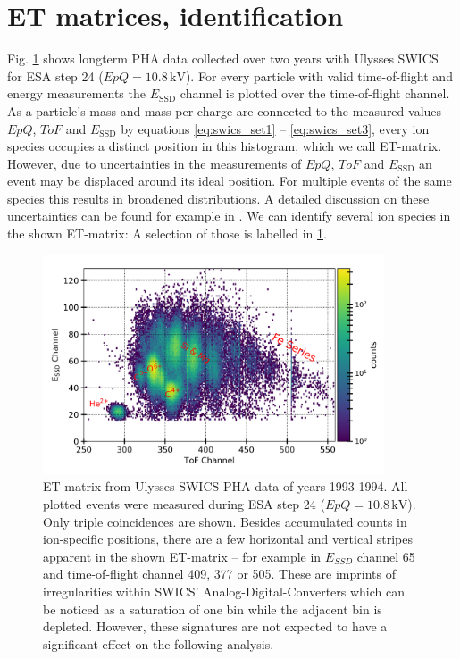 \section{ET matrices, identification}
\label{sec:etmatrices}
Fig. \ref{fig:et_matrix} shows longterm PHA data collected over two years with Ulysses SWICS for ESA step 24 ($EpQ = 10.8\,\mathrm{kV}$). For every particle with valid time-of-flight and energy measurements the $E_{\mathrm{SSD}}$ channel is plotted over the time-of-flight channel. As a particle's mass and mass-per-charge are connected to the measured values $EpQ$, $ToF$ and $E_{\mathrm{SSD}}$ by equations \ref{eq:swics_set1} --  \ref{eq:swics_set3}, every ion species occupies a distinct position in this histogram, which we call ET-matrix. 
However, due to uncertainties in the measurements of $EpQ$, $ToF$ and $E_{\mathrm{SSD}}$ an event may be displaced around its ideal position. 
For multiple events of the same species this results in broadened distributions. A detailed discussion on these uncertainties can be found for example in \citet{lars-phd}.
We can identify several ion species in the shown ET-matrix: A selection of those is labelled in \ref{fig:et_matrix}.



\begin{figure}[h]
	\includegraphics[width=0.9\textwidth]{Figures/et_matrix_labels.png}
	\centering
	\caption{ET-matrix from Ulysses SWICS PHA data of years 1993-1994. All plotted events were measured during ESA step 24 ($EpQ = 10.8\,\mathrm{kV}$). Only triple coincidences are shown. Besides accumulated counts in ion-specific positions, there are a few horizontal and vertical stripes apparent in the shown ET-matrix -- for example in $E_{SSD}$ channel 65 and time-of-flight channel 409, 377 or 505. These are imprints of irregularities within SWICS' Analog-Digital-Converters which can be noticed as a saturation of one bin while the adjacent bin is depleted. However, these signatures are not expected to have a significant effect on the following analysis.}
	\label{fig:et_matrix}
\end{figure}


